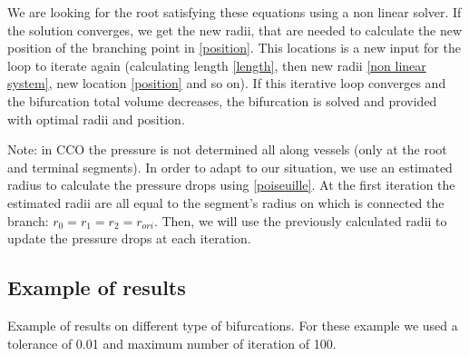 \documentclass[a4paper, 11pt]{article} %
\begin{document}
We are looking for the root satisfying these equations using a non linear solver. If the solution converges, we get the new radii, that are needed to calculate the new position of the branching point in \eqref{position}. This locations is a new input for the loop to iterate again (calculating length \eqref{length}, then new radii \eqref{non linear system}, new location \eqref{position} and so on). 
If this iterative loop converges and the bifurcation total volume decreases, the bifurcation is solved and provided with optimal radii and position.

Note: in CCO the pressure is not determined all along vessels (only at the root and terminal segments). In order to adapt to our situation, we use an estimated radius to calculate the pressure drops using \eqref{poiseuille}. At the first iteration the estimated radii are all equal to the segment's radius on which is connected the branch: $r_0 = r_1 = r_2 = r_{ori}$.
Then, we will use the previously calculated radii to update the pressure drops at each iteration.

\subsection*{Example of results}
Example of results on different type of bifurcations. For these example we used a tolerance of 0.01 and maximum number of iteration of 100.\\
\end{document}

